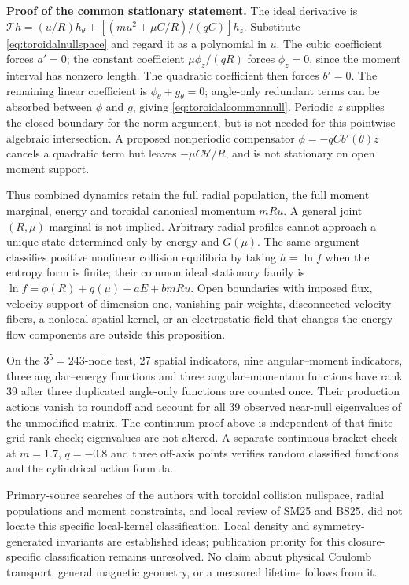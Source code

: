 \documentclass[11pt,letterpaper]{article}
\begin{document}
\textbf{Proof of the common stationary statement.} The ideal derivative is
$\mathcal T h=(u/R)h_\theta+
[(m u^2+\mu C/R)/(qC)]h_z$.
Substitute \eqref{eq:toroidalnullspace} and regard it as a polynomial in $u$.
The cubic coefficient forces $a'=0$; the constant coefficient
$\mu\phi_z/(qR)$ forces $\phi_z=0$, since the moment interval has nonzero
length. The quadratic coefficient then forces $b'=0$.
The remaining linear coefficient is $\phi_\theta+g_\theta=0$;
angle-only redundant terms can be absorbed between $\phi$ and $g$, giving
\eqref{eq:toroidalcommonnull}. Periodic $z$ supplies the closed boundary for
the norm argument, but is not needed for this pointwise algebraic intersection.
A proposed nonperiodic compensator $\phi=-qC b'(\theta)z$ cancels a quadratic
term but leaves $-\mu C b'/R$, and is not stationary on open moment support.

Thus combined dynamics retain the full radial population, the full moment
marginal, energy and toroidal canonical momentum $mRu$. A general joint
$(R,\mu)$ marginal is not implied. Arbitrary radial profiles cannot approach a
unique state determined only by energy and $G(\mu)$.
The same argument classifies positive nonlinear collision equilibria by taking
$h=\ln f$ when the entropy form is finite; their common ideal stationary family
is $\ln f=\phi(R)+g(\mu)+aE+b mRu$.
Open boundaries with imposed flux, velocity support of dimension one,
vanishing pair weights, disconnected velocity fibers, a nonlocal spatial
kernel, or an electrostatic field that changes the energy-flow components
are outside this proposition.

On the $3^5=243$-node test, 27 spatial indicators, nine angular--moment
indicators, three angular--energy functions and three angular--momentum
functions have rank 39 after three duplicated angle-only functions are counted
once. Their production actions vanish to roundoff and account for all 39
observed near-null eigenvalues of the unmodified matrix. The continuum proof
above is independent of that finite-grid rank check; eigenvalues are not altered.
A separate continuous-bracket check at $m=1.7$, $q=-0.8$ and three off-axis
points verifies random classified functions and the cylindrical action formula.

Primary-source searches of the authors with toroidal collision nullspace,
radial populations and moment constraints, and local review of SM25 and BS25,
did not locate this specific local-kernel classification. Local density and
symmetry-generated invariants are established ideas; publication priority for
this closure-specific classification remains unresolved. No claim about
physical Coulomb transport, general magnetic geometry, or a measured lifetime
follows from it.
\end{document}
